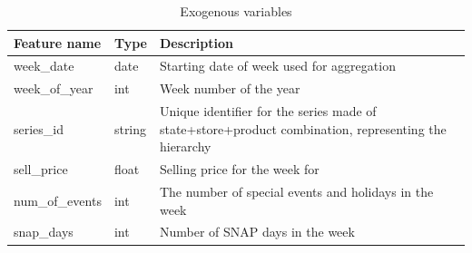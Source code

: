 \begin{table}
    \begin{tabular}{
        |p{} %
        |p{}  %
        |p{}  %
        |}
        \hline
        Feature name    & Type   & Description                                                                                          \\
        \hline
        week\_date      & date   & Starting date of week used for aggregation                                                           \\
        \hline
        week\_of\_year  & int    & Week number of the year                                                                              \\
        \hline
        series\_id      & string & Unique identifier for the series made of state+store+product combination, representing the hierarchy \\
        \hline
        sell\_price     & float  & Selling price for the week for                                                                       \\
        \hline
        num\_of\_events & int    & The number of special events and holidays in the week                                                \\
        \hline
        snap\_days      & int    & Number of SNAP days in the week                                                                      \\
        \hline
    \end{tabular}
    \caption{Exogenous variables}
    \label{tab:exog_data_structure}
\end{table}

